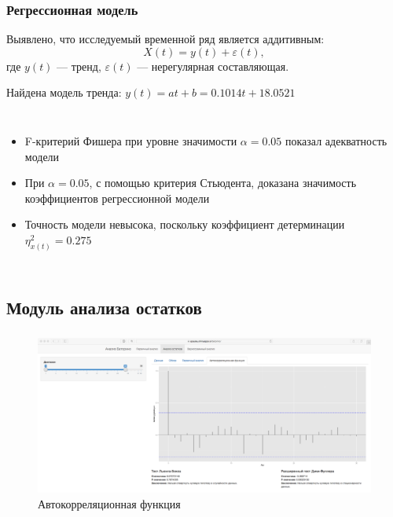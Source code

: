 \documentclass[notheorems]{beamer}
\theoremstyle{definition}
\theoremstyle{example}
\theoremstyle{plain}
\begin{document}
\begin{frame}
  \frametitle{Регрессионная модель}
  Выявлено, что исследуемый временной ряд является аддитивным:
  \begin{equation}
    X(t) = y(t) + \varepsilon(t),
  \end{equation}
  где $ y(t) $ --- тренд, $ \varepsilon(t) $ --- нерегулярная составляющая.

  \vspace{0.2em}

  \begin{center}
    Найдена модель тренда: $ y(t) = at + b = 0.1014t + 18.0521 $
  \end{center}
  \begin{columns}[c]
  \column{3in}

  \begin{itemize}
      \item F-критерий Фишера при уровне значимости $ \alpha = 0.05 $ показал адекватность модели
      \item При $ \alpha=0.05 $, с помощью критерия Стьюдента, доказана значимость коэффициентов регрессионной модели
      \item Точность модели невысока, поскольку коэффициент детерминации $ \eta^2_{x(t)} = 0.275 $
    \end{itemize}
  \column{3in}
    
  \end{columns}
\end{frame}

\subsection{Модуль анализа остатков}

\begin{frame}
  \frametitle{\large\secname}
  \framesubtitle{\subsecname}
    \begin{figure}[h]
    \includegraphics[width=1\textwidth]{../../figures/static/3_acf.png}
    \caption{Автокорреляционная функция}
  \end{figure}
\end{frame}
\end{document}
